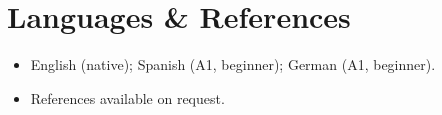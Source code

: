 \documentclass[11pt,a4paper,sans]{moderncv}
\begin{document}

\section{Languages \& References}
\vspace{1pt}
\begin{itemize}
\item English (native); Spanish (A1, beginner); German (A1, beginner).
\item References available on request.
\end{itemize}
\end{document}
